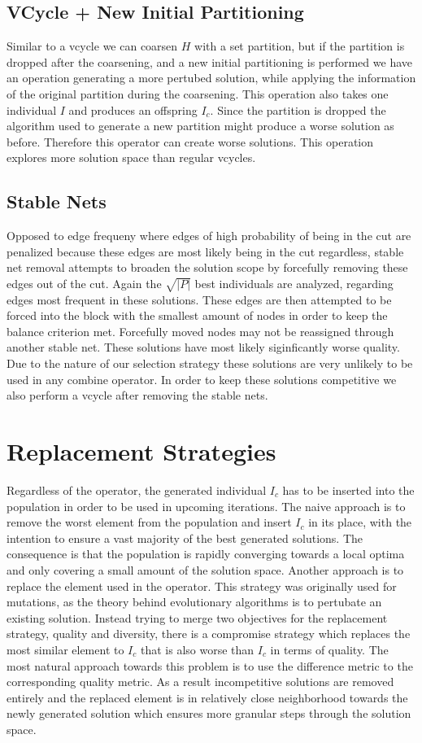 \documentclass[a4paper,12pt,bibtotoc,titlepage, liststotoc,BCOR7mm,headsepline,pointlessnumbers]{scrbook}
\numberwithin{equation}{section}
\begin{document}
\subsection{VCycle + New Initial Partitioning}
Similar to a vcycle we can coarsen $H$ with a set partition, but if the partition is dropped after the coarsening, and a new initial partitioning is performed we have an operation generating a more pertubed solution, while applying the information of the original partition during the coarsening. This operation also takes one individual $I$ and produces an offspring $I_c$. Since the partition is
dropped the algorithm used to generate a new partition might produce a worse solution as before. Therefore this operator can create worse solutions. This operation explores more solution space than regular vcycles.  
\subsection{Stable Nets}
Opposed to edge frequeny where edges of high probability of being in the cut are penalized because these edges are most likely being in the cut regardless, stable net removal attempts to broaden the solution scope by forcefully removing these edges out of the cut. Again the $\sqrt{|P|}$ best individuals are analyzed, regarding edges most frequent in these solutions. These edges are then attempted to be forced into the block with the smallest amount of nodes in order to keep the balance criterion met. Forcefully moved nodes may not be reassigned through another stable net. These solutions have most likely siginficantly worse quality. Due to the nature of our selection strategy these solutions are very unlikely to be used in any combine operator. In order to keep these solutions competitive we also perform a vcycle after removing the stable nets. 
\section{Replacement Strategies}
Regardless of the operator, the generated individual $I_c$ has to be inserted into the population in order to be used in upcoming iterations. 
The naive approach is to remove the worst element from the population and insert $I_c$ in its place, with the intention to ensure a vast majority of the best generated solutions. The consequence is that the population is rapidly converging towards a local optima and only covering a small amount of the solution space. Another approach is to replace the element used in the operator. This strategy was originally used for mutations, as the theory behind evolutionary algorithms is to pertubate an existing solution. Instead trying to merge two objectives for the replacement strategy, quality and diversity, there is a compromise strategy which replaces the most similar element to $I_c$ that is also worse than $I_c$ in terms of quality. The most natural approach towards this problem is to use the difference metric to the corresponding quality metric. As a result incompetitive solutions are removed entirely and the replaced element is in relatively close neighborhood towards the newly generated solution which ensures more granular steps through the solution space. 
\end{document}
